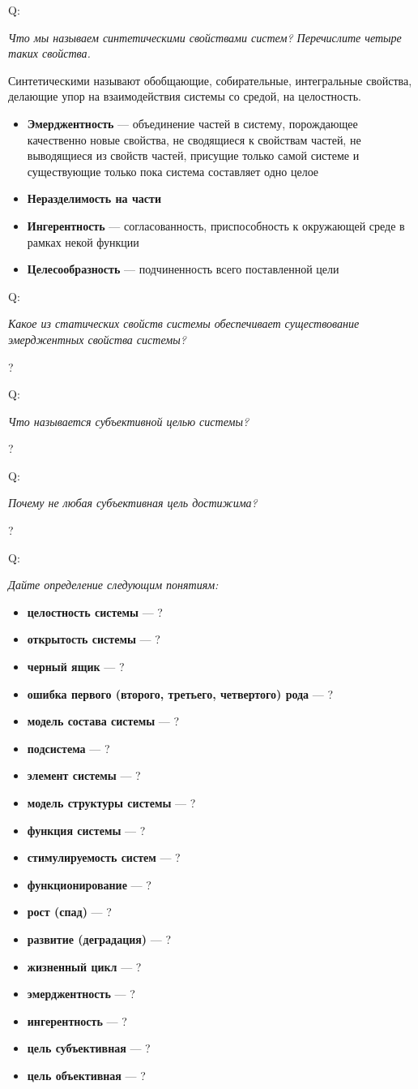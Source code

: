 \documentclass{article}
\newcommand{\important}[1]{\textbf{#1}}
\newcommand{\define}[2]{
	\textbf{#1} --- #2
	}
\newcommand{\question}[2]{
	\begin{flushright}
		Q:\hspace{2ex}\vline\hspace{2ex}
		\begin{minipage}{0.9\textwidth}
			\large
			\textit{#1}
		\end{minipage}
	\end{flushright}
	\begin{center}
		\begin{minipage}{0.95\textwidth}
			#2
		\end{minipage}
	\end{center}
	}
\begin{document}
\question{Что мы называем синтетическими свойствами систем? Перечислите четыре таких свойства.}{Синтетическими называют обобщающие, собирательные, интегральные свойства, делающие упор на взаимодействия системы со средой, на целостность.
	\begin{itemize}
	\item \define{Эмерджентность}{объединение частей в систему, порождающее качественно новые свойства, не сводящиеся к свойствам частей, не выводящиеся из свойств частей, присущие только самой системе и существующие только пока система составляет одно целое}
	\item \important{Неразделимость на части}
	\item \define{Ингерентность}{согласованность, приспособность к окружающей среде в рамках некой функции}
	\item \define{Целесообразность}{подчиненность всего поставленной цели}
	\end{itemize}}
\question{Какое из статических свойств системы обеспечивает существование эмерджентных свойства системы?}{?}
\question{Что называется субъективной целью системы?}{?}
\question{Почему не любая субъективная цель достижима?}{?}
\question{Дайте определение следующим понятиям:}{
\begin{itemize}
	\item \define{целостность системы}{?}
	\item \define{открытость системы}{?}
	\item \define{черный ящик}{?}
	\item \define{ошибка первого (второго, третьего, четвертого) рода}{?}
	\item \define{модель состава системы}{?}
	\item \define{подсистема}{?}
	\item \define{элемент системы}{?}
	\item \define{модель структуры системы}{?}
	\item \define{функция системы}{?}
	\item \define{стимулируемость систем}{?}
	\item \define{функционирование}{?}
	\item \define{рост (спад)}{?}
	\item \define{развитие (деградация)}{?}
	\item \define{жизненный цикл}{?}
	\item \define{эмерджентность}{?}
	\item \define{ингерентность}{?}
	\item \define{цель субъективная}{?}
	\item \define{цель объективная}{?}
\end{itemize}}
\end{document}
